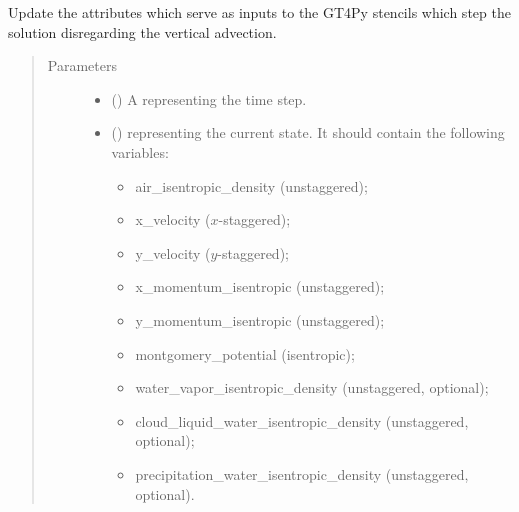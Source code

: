 \documentclass[letterpaper,10pt,english]{sphinxmanual}
\begin{document}
\begin{fulllineitems}
\begin{fulllineitems}
\label{\detokenize{api:tasmania.dycore.prognostic_isentropic.PrognosticIsentropic._stencils_stepping_by_neglecting_vertical_advection_set_inputs}}
Update the attributes which serve as inputs to the GT4Py stencils which step the solution
disregarding the vertical advection.
\begin{quote}\begin{description}
\item[{Parameters}] \leavevmode\begin{itemize}
\item {} 
 () \textendash{} A  representing the time step.

\item {} 
 () \textendash{} 
{\hyperref[\detokenize{api:tasmania.storages.state_isentropic.StateIsentropic}]{}} representing the current state.
It should contain the following variables:
\begin{itemize}
\item {} 
air\_isentropic\_density (unstaggered);

\item {} 
x\_velocity (\(x\)-staggered);

\item {} 
y\_velocity (\(y\)-staggered);

\item {} 
x\_momentum\_isentropic (unstaggered);

\item {} 
y\_momentum\_isentropic (unstaggered);

\item {} 
montgomery\_potential (isentropic);

\item {} 
water\_vapor\_isentropic\_density (unstaggered, optional);

\item {} 
cloud\_liquid\_water\_isentropic\_density (unstaggered, optional);

\item {} 
precipitation\_water\_isentropic\_density (unstaggered, optional).

\end{itemize}



\end{itemize}
\end{description}
\end{quote}
\end{fulllineitems}
\end{fulllineitems}
\end{document}
